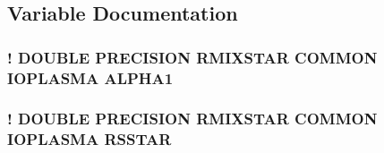 \subsection{Variable Documentation}
\hypertarget{ioplasma_8com_a059782248de484bdd9a19c36ff24c43f}{
\subsubsection[{A\-L\-P\-H\-A1}]{\setlength{\rightskip}{0pt plus 5cm}! D\-O\-U\-B\-L\-E P\-R\-E\-C\-I\-S\-I\-O\-N R\-M\-I\-X\-S\-T\-A\-R C\-O\-M\-M\-O\-N I\-O\-P\-L\-A\-S\-M\-A A\-L\-P\-H\-A1}}\label{ioplasma_8com_a059782248de484bdd9a19c36ff24c43f}
\hypertarget{ioplasma_8com_aff825817ea4a80a3e049f2ba02de4683}{
\subsubsection[{R\-S\-S\-T\-A\-R}]{\setlength{\rightskip}{0pt plus 5cm}! D\-O\-U\-B\-L\-E P\-R\-E\-C\-I\-S\-I\-O\-N R\-M\-I\-X\-S\-T\-A\-R C\-O\-M\-M\-O\-N I\-O\-P\-L\-A\-S\-M\-A R\-S\-S\-T\-A\-R}}\label{ioplasma_8com_aff825817ea4a80a3e049f2ba02de4683}
